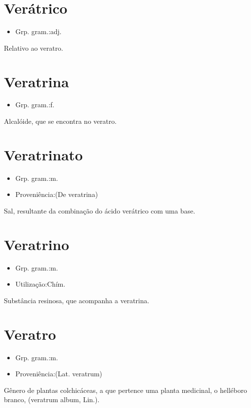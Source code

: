 \documentclass{article}
\begin{document}
\section{Verátrico}
\begin{itemize}
\item {Grp. gram.:adj.}
\end{itemize}
Relativo ao veratro.
\section{Veratrina}
\begin{itemize}
\item {Grp. gram.:f.}
\end{itemize}
Alcalóide, que se encontra no veratro.
\section{Veratrinato}
\begin{itemize}
\item {Grp. gram.:m.}
\end{itemize}
\begin{itemize}
\item {Proveniência:(De \textunderscore veratrina\textunderscore )}
\end{itemize}
Sal, resultante da combinação do ácido verátrico com uma base.
\section{Veratrino}
\begin{itemize}
\item {Grp. gram.:m.}
\end{itemize}
\begin{itemize}
\item {Utilização:Chím.}
\end{itemize}
Substância resinosa, que acompanha a veratrina.
\section{Veratro}
\begin{itemize}
\item {Grp. gram.:m.}
\end{itemize}
\begin{itemize}
\item {Proveniência:(Lat. \textunderscore veratrum\textunderscore )}
\end{itemize}
Gênero de plantas colchicáceas, a que pertence uma planta medicinal, o helléboro branco, (\textunderscore veratrum album\textunderscore , Lin.).
\end{document}
